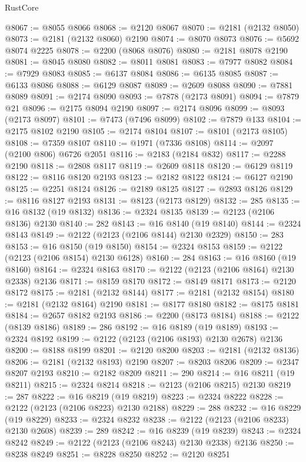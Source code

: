 \begin{lexlean}{RustCore}
\begin{coremodule}
@8067 := @8055 @8066
@8068 := @2120 @8067
@8070 := @2181 (@2132 @8050)
@8073 := @2181 (@2132 @8060) @2190
@8074 := @8070 @8073
@8076 := @5692 @8074 @2225
@8078 := @2200 (@8068 @8076)
@8080 := @2181 @8078 @2190
@8081 := @8045 @8080
@8082 := @8011 @8081
@8083 := @7977 @8082
@8084 := @7929 @8083
@8085 := @6137 @8084
@8086 := @6135 @8085
@8087 := @6133 @8086
@8088 := @6129 @8087
@8089 := @2609 @8088
@8090 := @7881 @8089
@8091 := @2174 @8090
@8093 := @7878 (@2173 @8091)
@8094 := @7879 @21
@8096 := @2175 @8094 @2190
@8097 := @2174 @8096
@8099 := @8093 (@2173 @8097)
@8101 := @7473 (@7496 @8099)
@8102 := @7879 @133
@8104 := @2175 @8102 @2190
@8105 := @2174 @8104
@8107 := @8101 (@2173 @8105)
@8108 := @7359 @8107
@8110 := @1971 (@7336 @8108)
@8114 := @2097 (@2100 @806) @6726 @2051
@8116 := @2183 (@2184 @832)
@8117 := @2288 @2190
@8118 := @2808 @8117
@8119 := @2609 @8118
@8120 := @6129 @8119
@8122 := @8116 @8120 @2193
@8123 := @2182 @8122
@8124 := @6127 @2190
@8125 := @2251 @8124
@8126 := @2189 @8125
@8127 := @2893 @8126
@8129 := @8116 @8127 @2193
@8131 := @8123 (@2173 @8129)
@8132 := 285
@8135 := @16 @8132 (@19 @8132)
@8136 := @2324 @8135
@8139 := @2123 (@2106 @8136) @2130
@8140 := 282
@8143 := @16 @8140 (@19 @8140)
@8144 := @2324 @8143
@8149 := @2122 (@2123 (@2106 @8144) @2130 @2329)
@8150 := 283
@8153 := @16 @8150 (@19 @8150)
@8154 := @2324 @8153
@8159 := @2122 (@2123 (@2106 @8154) @2130 @6128)
@8160 := 284
@8163 := @16 @8160 (@19 @8160)
@8164 := @2324 @8163
@8170 := @2122 (@2123 (@2106 @8164) @2130 @2338) @2136
@8171 := @8159 @8170
@8172 := @8149 @8171
@8173 := @2120 @8172
@8175 := @2181 (@2132 @8144)
@8177 := @2181 (@2132 @8154)
@8180 := @2181 (@2132 @8164) @2190
@8181 := @8177 @8180
@8182 := @8175 @8181
@8184 := @2657 @8182 @2193
@8186 := @2200 (@8173 @8184)
@8188 := @2122 (@8139 @8186)
@8189 := 286
@8192 := @16 @8189 (@19 @8189)
@8193 := @2324 @8192
@8199 := @2122 (@2123 (@2106 @8193) @2130 @2678) @2136
@8200 := @8188 @8199
@8201 := @2120 @8200
@8203 := @2181 (@2132 @8136)
@8206 := @2181 (@2132 @8193) @2190
@8207 := @8203 @8206
@8209 := @2347 @8207 @2193
@8210 := @2182 @8209
@8211 := 290
@8214 := @16 @8211 (@19 @8211)
@8215 := @2324 @8214
@8218 := @2123 (@2106 @8215) @2130
@8219 := 287
@8222 := @16 @8219 (@19 @8219)
@8223 := @2324 @8222
@8228 := @2122 (@2123 (@2106 @8223) @2130 @2188)
@8229 := 288
@8232 := @16 @8229 (@19 @8229)
@8233 := @2324 @8232
@8238 := @2122 (@2123 (@2106 @8233) @2130 @2608)
@8239 := 289
@8242 := @16 @8239 (@19 @8239)
@8243 := @2324 @8242
@8249 := @2122 (@2123 (@2106 @8243) @2130 @2338) @2136
@8250 := @8238 @8249
@8251 := @8228 @8250
@8252 := @2120 @8251

\end{coremodule}
\end{lexlean}
